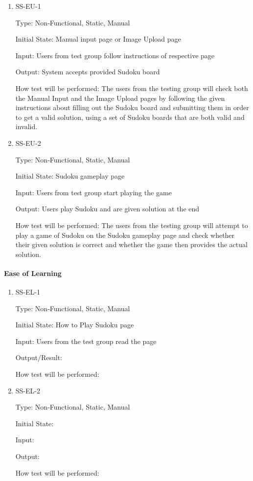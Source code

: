 \documentclass[11pt]{article}
\begin{document}
\begin{enumerate}

\item{SS-EU-1\\}

Type: Non-Functional, Static, Manual
					
Initial State: Manual input page or Image Upload page
					
Input: Users from test group follow instructions of respective page
					
Output: System accepts provided Sudoku board
					
How test will be performed: The users from the testing group will check both the Manual Input and the Image Upload pages by following the given instructions about filling out the Sudoku board and submitting them in order to get a valid solution, using a set of Sudoku boards that are both valid and invalid.
					
\item{SS-EU-2\\}

Type: Non-Functional, Static, Manual
					
Initial State: Sudoku gameplay page
					
Input: Users from test group start playing the game
					
Output: Users play Sudoku and are given solution at the end
					
How test will be performed: The users from the testing group will attempt to play a game of Sudoku on the Sudoku gameplay page and check whether their given solution is correct and whether the game then provides the actual solution.

\end{enumerate}

\paragraph{Ease of Learning}

\begin{enumerate}

\item{SS-EL-1\\}

Type: Non-Functional, Static, Manual
					
Initial State: How to Play Sudoku page
					
Input: Users from the test group read the page 
					
Output/Result: 
					
How test will be performed: 
					
\item{SS-EL-2\\}

Type: Non-Functional, Static, Manual
					
Initial State: 
					
Input: 
					
Output: 
					
How test will be performed: 

\end{enumerate}
\end{document}
